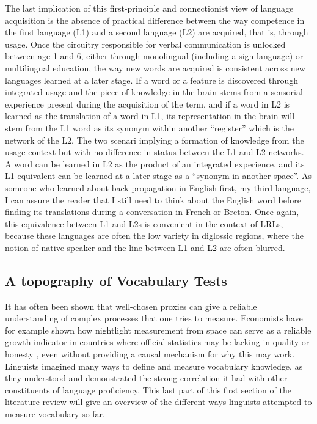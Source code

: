 The last implication of this first-principle and connectionist view of language acquisition is the absence of practical difference between the way competence in the first language (L1) and a second language (L2) are acquired, that is, through usage. Once the circuitry responsible for verbal communication is unlocked between age 1 and 6, either through monolingual (including a sign language) or multilingual education, the way new words are acquired is consistent across new languages learned at a later stage. If a word or a feature is discovered through integrated usage and the piece of knowledge in the brain stems from a sensorial experience present during the acquisition of the term, and if a word in L2 is learned as the translation of a word in L1, its representation in the brain will stem from the L1 word as its synonym within another ``register'' which is the network of the L2. The two scenari implying a formation of knowledge from the usage context but with no difference in status between the L1 and L2 networks. A word can be learned in L2 as the product of an integrated experience, and its L1 equivalent can be learned at a later stage as a ``synonym in another space''. As someone who learned about back-propagation in English first, my third language, I can assure the reader that I still need to think about the English word before finding its translations during a conversation in French or Breton. Once again, this equivalence between L1 and L2s is convenient in the context of LRLs, because these languages are often the low variety in diglossic regions, where the notion of native speaker and the line between L1 and L2 are often blurred.

    \subsection{A topography of Vocabulary Tests}
It has often been shown that well-chosen proxies can give a reliable understanding of complex processes that one tries to measure. Economists have for example shown how nightlight measurement from space can serve as a reliable growth indicator in countries where official statistics may be lacking in quality or honesty \parencite{henderson_measuring_2009}, even without providing a causal mechanism for why this may work. Linguists imagined many ways to define and measure vocabulary knowledge, as they understood and demonstrated the strong correlation it had with other constituents of language proficiency. This last part of this first section of the literature review will give an overview of the different ways linguists attempted to measure vocabulary so far.

